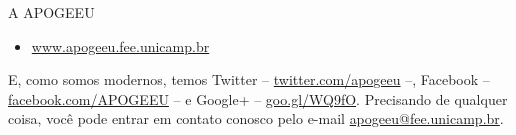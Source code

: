 \begin{story}{A APOGEEU}
\begin{itemize}
\item \url{www.apogeeu.fee.unicamp.br}
\end{itemize}

E, como somos modernos, temos Twitter -- \url{twitter.com/apogeeu} --, Facebook -- \url{facebook.com/APOGEEU} -- e Google+ -- \url{goo.gl/WQ9fO}. Precisando de qualquer coisa, você pode entrar em contato conosco pelo e-mail \url{apogeeu@fee.unicamp.br}.

\end{story}

